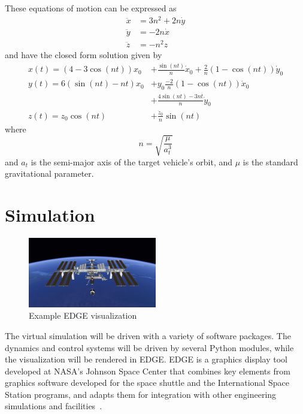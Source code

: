 \documentclass[journal, 10pt]{IEEEtran}
\begin{document}
These equations of motion can be expressed as
\begin{equation}
\begin{split}
\ddot{x} &= 3n^2 + 2n\dot y \\
\ddot{y} &= -2n\dot x \\
\ddot{z} &= -n^2z
\end{split}
\end{equation}
and have the closed form solution given by
\begin{equation}
\begin{split}
x(t) = (4-3 \cos{(nt)})x_0 &+ \frac{\sin{(nt)}}{n}\dot x_0 + \frac{2}{n} (1 - \cos(nt))\dot y_0\\
y(t) = 6(\sin{(nt)}-nt)x_0 &+ y_0 \frac{-2}{n}(1 - \cos{(nt)})\dot x_0 \\
                         &+ \frac{4 \sin{(nt)} - 3nt}{n}\dot y_0 \\
z(t) = z_0 \cos{(nt)} &+ \frac{\dot z_0}{n} \sin{(nt)}
\end{split}
\end{equation}
where
\begin{equation}
n = \sqrt{\frac{\mu}{a^3_t}}
\end{equation}
and $a_t$ is the semi-major axis of the target vehicle's orbit, and $\mu$ is the standard gravitational parameter.

\section{Simulation}

\begin{figure}[tb]
\begin{center}
\includegraphics[width=0.5\textwidth]{figures/EDGE_ISS.jpeg}
\caption{Example EDGE visualization}
\label{edge_iss}
\end{center}
\end{figure}

The virtual simulation will be driven with a variety of software packages. The dynamics and control systems will be driven by several Python modules, while the visualization will be rendered in EDGE. EDGE is a graphics display tool developed at NASA's Johnson Space Center that combines key elements from graphics software developed for the space shuttle and the International Space Station programs, and adapts them for integration with other engineering simulations and facilities~\cite{EDGE}.
\end{document}
